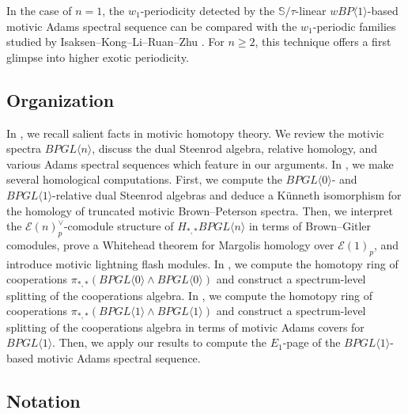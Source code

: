 \documentclass{amsart}
\theoremstyle{plain}
\numberwithin{theorem}{section}
\numberwithin{equation}{section}
\numberwithin{figure}{section}
\newcommand{\0}{\langle 0 \rangle }
\begin{document}
In the case of $n=1$, the $w_1$-periodicity detected by the $\mathbb{S}/\tau$-linear $wBP\langle 1 \rangle$-based motivic Adams spectral sequence can be compared with the $w_1$-periodic families studied by Isaksen--Kong--Li--Ruan--Zhu \cite{IsaKonLiYuaZhu25}. For $n \geq 2$, this technique offers a first glimpse into higher exotic periodicity. 


\subsection{Organization}
In , we recall salient facts in motivic homotopy theory. We review the motivic spectra $BPGL \langle n \rangle$, discuss the dual Steenrod algebra, relative homology, and various Adams spectral sequences which feature in our arguments. In , we make several homological computations. First, we compute the $BPGL \langle 0 \rangle$- and $BPGL \langle 1 \rangle$-relative dual Steenrod algebras and deduce a K\"unneth isomorphism for the homology of truncated motivic Brown--Peterson spectra. Then, we interpret the $\mathcal{E}(n)^\vee_p$-comodule structure of $H_{*,*}BPGL \langle n \rangle$ in terms of Brown--Gitler comodules, prove a Whitehead theorem for Margolis homology over $\mathcal{E}(1)_p$, and introduce motivic lightning flash modules. In , we compute the homotopy ring of cooperations $\pi_{*,*}(BPGL \langle 0 \rangle \wedge BPGL \langle 0 \rangle)$ and construct a spectrum-level splitting of the cooperations algebra. In , we compute the homotopy ring of cooperations $\pi_{*,*}(BPGL \langle 1 \rangle \wedge BPGL \langle 1 \rangle)$ and construct a spectrum-level splitting of the cooperations algebra in terms of motivic Adams covers for $BPGL \langle 1 \rangle$. Then, we apply our results to compute the $E_1$-page of the $BPGL\langle 1 \rangle$-based motivic Adams spectral sequence.

\subsection{Notation}
\end{document}
